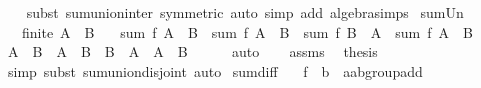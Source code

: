 \begin{isabellebody}
%
\isadelimproof
\ \ %
\endisadelimproof
%
\isatagproof
{}\isamarkupfalse%
\ {\isacharparenleft}{\kern0pt}subst\ sum{\isachardot}{\kern0pt}union{\isacharunderscore}{\kern0pt}inter\ {\isacharbrackleft}{\kern0pt}symmetric{\isacharbrackright}{\kern0pt}{\isacharparenright}{\kern0pt}\ {\isacharparenleft}{\kern0pt}auto\ simp\ add{\isacharcolon}{\kern0pt}\ algebra{\isacharunderscore}{\kern0pt}simps{\isacharparenright}{\kern0pt}%
\endisatagproof
{\isafoldproof}%
%
\isadelimproof
\isanewline
%
\endisadelimproof
\isanewline
{}\isamarkupfalse%
\ sum{\isacharunderscore}{\kern0pt}Un{}{\isacharcolon}{\kern0pt}\isanewline
\ \ \ {\isachardoublequoteopen}finite\ {\isacharparenleft}{\kern0pt}A\ {\isasymunion}\ B{\isacharparenright}{\kern0pt}{\isachardoublequoteclose}\isanewline
\ \ \ {\isachardoublequoteopen}sum\ f\ {\isacharparenleft}{\kern0pt}A\ {\isasymunion}\ B{\isacharparenright}{\kern0pt}\ {\isacharequal}{\kern0pt}\ sum\ f\ {\isacharparenleft}{\kern0pt}A\ {\isacharminus}{\kern0pt}\ B{\isacharparenright}{\kern0pt}\ {\isacharplus}{\kern0pt}\ sum\ f\ {\isacharparenleft}{\kern0pt}B\ {\isacharminus}{\kern0pt}\ A{\isacharparenright}{\kern0pt}\ {\isacharplus}{\kern0pt}\ sum\ f\ {\isacharparenleft}{\kern0pt}A\ {\isasyminter}\ B{\isacharparenright}{\kern0pt}{\isachardoublequoteclose}\isanewline
%
\isadelimproof
%
\endisadelimproof
%
\isatagproof
{}\isamarkupfalse%
\ {\isacharminus}{\kern0pt}\isanewline
\ \ \isamarkupfalse%
\ {\isachardoublequoteopen}A\ {\isasymunion}\ B\ {\isacharequal}{\kern0pt}\ A\ {\isacharminus}{\kern0pt}\ B\ {\isasymunion}\ {\isacharparenleft}{\kern0pt}B\ {\isacharminus}{\kern0pt}\ A{\isacharparenright}{\kern0pt}\ {\isasymunion}\ A\ {\isasyminter}\ B{\isachardoublequoteclose}\isanewline
\ \ \ \ \isamarkupfalse%
\ auto\isanewline
\ \ \isamarkupfalse%
\ assms\ \isamarkupfalse%
\ {\isacharquery}{\kern0pt}thesis\isanewline
\ \ \ \ \isamarkupfalse%
\ simp\ {\isacharparenleft}{\kern0pt}subst\ sum{\isachardot}{\kern0pt}union{\isacharunderscore}{\kern0pt}disjoint{\isacharcomma}{\kern0pt}\ auto{\isacharparenright}{\kern0pt}{\isacharplus}{\kern0pt}\isanewline
{}\isamarkupfalse%
%
\endisatagproof
{\isafoldproof}%
%
\isadelimproof
\isanewline
%
\endisadelimproof
\isanewline
{}\isamarkupfalse%
\ sum{\isacharunderscore}{\kern0pt}diff{}{\isacharcolon}{\kern0pt}\isanewline
\ \ \ f\ {\isacharcolon}{\kern0pt}{\isacharcolon}{\kern0pt}\ {\isachardoublequoteopen}{\isacharprime}{\kern0pt}b\ {\isasymRightarrow}\ {\isacharprime}{\kern0pt}a{\isacharcolon}{\kern0pt}{\isacharcolon}{\kern0pt}ab{\isacharunderscore}{\kern0pt}group{\isacharunderscore}{\kern0pt}add{\isachardoublequoteclose}\isanewline

\end{isabellebody}

